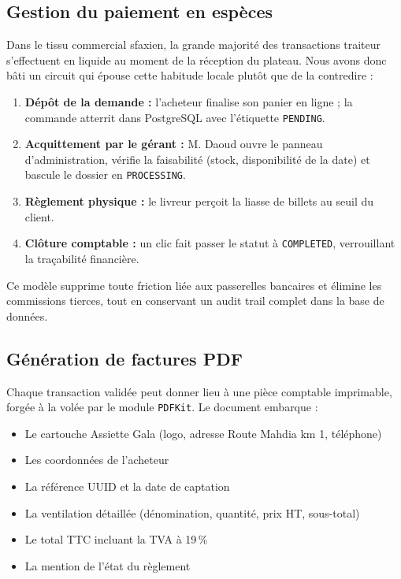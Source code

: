 


\subsection{Gestion du paiement en espèces}

Dans le tissu commercial sfaxien, la grande majorité des transactions traiteur s'effectuent en liquide au moment de la réception du plateau. Nous avons donc bâti un circuit qui épouse cette habitude locale plutôt que de la contredire :

\begin{enumerate}
    \item \textbf{Dépôt de la demande :} l'acheteur finalise son panier en ligne ; la commande atterrit dans PostgreSQL avec l'étiquette \texttt{PENDING}.
    \item \textbf{Acquittement par le gérant :} M. Daoud ouvre le panneau d'administration, vérifie la faisabilité (stock, disponibilité de la date) et bascule le dossier en \texttt{PROCESSING}.
    \item \textbf{Règlement physique :} le livreur perçoit la liasse de billets au seuil du client.
    \item \textbf{Clôture comptable :} un clic fait passer le statut à \texttt{COMPLETED}, verrouillant la traçabilité financière.
\end{enumerate}

Ce modèle supprime toute friction liée aux passerelles bancaires et élimine les commissions tierces, tout en conservant un audit trail complet dans la base de données.

\subsection{Génération de factures PDF}

Chaque transaction validée peut donner lieu à une pièce comptable imprimable, forgée à la volée par le module \texttt{PDFKit}. Le document embarque :

\begin{itemize}
    \item Le cartouche Assiette Gala (logo, adresse Route Mahdia km 1, téléphone)
    \item Les coordonnées de l'acheteur
    \item La référence UUID et la date de captation
    \item La ventilation détaillée (dénomination, quantité, prix HT, sous-total)
    \item Le total TTC incluant la TVA à 19\,\%
    \item La mention de l'état du règlement
\end{itemize}

